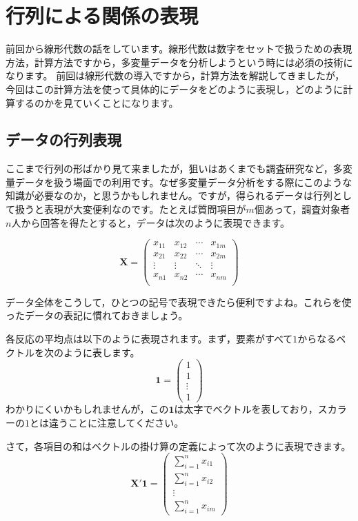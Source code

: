 \documentclass{ltjsbook}
\begin{document}
\chapter{行列による関係の表現}
\label{x07_matrixModel}
前回から線形代数の話をしています。線形代数は数字をセットで扱うための表現方法，計算方法ですから，多変量データを分析しようという時には必須の技術になります。
前回は線形代数の導入ですから，計算方法を解説してきましたが，今回はこの計算方法を使って具体的にデータをどのように表現し，どのように計算するのかを見ていくことになります。

\section{データの行列表現}

ここまで行列の形ばかり見て来ましたが，狙いはあくまでも調査研究など，多変量データを扱う場面での利用です。なぜ多変量データ分析をする際にこのような知識が必要なのか，と思うかもしれません。ですが，得られるデータは行列として扱うと表現が大変便利なのです。たとえば質問項目が$m$個あって，調査対象者$n$人から回答を得たとすると，データは次のように表現できます。

\[
	\bm{X}=
	\begin{pmatrix}
		x_{11} & x_{12} & \cdots & x_{1m} \\
		x_{21} & x_{22} & \cdots & x_{2m} \\
		\vdots & \vdots & \ddots & \vdots \\
		x_{n1} & x_{n2} & \cdots & x_{nm} \\
	\end{pmatrix}
\]

データ全体をこうして，ひとつの記号で表現できたら便利ですよね。これらを使ったデータの表記に慣れておきましょう。

各反応の平均点は以下のように表現されます。まず，要素がすべて$1$からなるベクトルを次のように表します。
\[ \bm{1}=\begin{pmatrix} 1 \\ 1 \\ \vdots \\1 \end{pmatrix} \]
わかりにくいかもしれませんが，この$\bm{1}$は太字でベクトルを表しており，スカラーの$1$とは違うことに注意してください。

さて，各項目の和はベクトルの掛け算の定義によって次のように表現できます。
\[ \bm{X}' \bm{1} = \begin{pmatrix} \sum_{i=1}^{n} x_{i1} \\ \sum_{i=1}^{n} x_{i2} \\ \vdots \\ \sum_{i=1}^{n} x_{im} \end{pmatrix} \]
\end{document}

